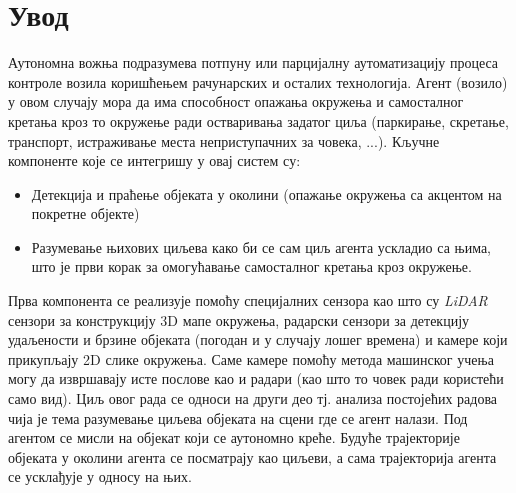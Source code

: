 \documentclass[11pt,oneside]{memoir}
\begin{document}
\frontmatter
\naslovna
\komisija
\apstrakt
\tableofcontents*

\mainmatter

\chapter{Увод}

Аутономна вожња подразумева потпуну или парцијалну аутоматизацију процеса контроле возила коришћењем рачунарских и осталих технологија. Агент (возило) 
у овом случају мора да има способност опажања окружења и самосталног кретања кроз то окружење ради остваривања задатог циља 
(паркирање, скретање, транспорт, истраживање места неприступачних за човека, ...). Кључне
компоненте које се интегришу у овај систем су:
\begin{itemize} 
  \item Детекција и праћење објеката у околини (опажање окружења са акцентом на покретне објекте) 
  \item Разумевање њихових циљева како би се сам циљ агента ускладио са њима, што је
        први корак за омогућавање самосталног кретања кроз окружење.
\end{itemize} 
Прва компонента се реализује помоћу специјалних сензора као што су \textit{LiDAR} сензори за конструкцију 3D мапе окружења, 
радарски сензори
за детекцију удаљености и брзине објеката (погодан и у случају лошег времена) и камере који прикупљају 2D слике окружења. Саме камере помоћу
метода машинског учења могу да извршавају исте послове као и радари (као што то човек ради користећи само вид). Циљ овог рада се односи на други део
тј. анализа постојећих радова чија је тема разумевање циљева објеката на сцени где се агент налази. 
Под агентом се мисли на објекат који се аутономно креће.
Будуће трајекторије објеката у околини агента се посматрају као циљеви, а сама трајекторија агента се усклађује у односу на њих.
\end{document}
